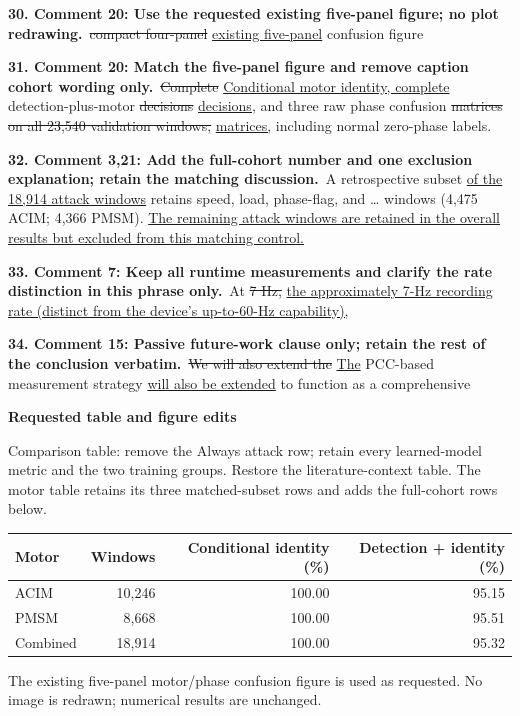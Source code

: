 \documentclass[10pt,letterpaper]{article}
\newcommand{\added}[1]{{\color{blue}\uline{#1}}}
\newcommand{\removed}[1]{{\color{red}\sout{#1}}}
\begin{document}
\textbf{30. Comment 20: Use the requested existing five-panel figure; no plot redrawing.}\
\removed{compact four-panel} \added{existing five-panel} confusion figure\par
\textbf{31. Comment 20: Match the five-panel figure and remove caption cohort wording only.}\
\removed{Complete} \added{Conditional motor identity, complete} detection-plus-motor \removed{decisions} \added{decisions,} and three raw phase confusion \removed{matrices on all 23,540 validation windows,} \added{matrices,} including normal zero-phase labels.\par
\textbf{32. Comment 3,21: Add the full-cohort number and one exclusion explanation; retain the matching discussion.}\
A retrospective subset \added{of the 18,914 attack windows} retains speed, load, phase-flag, and \ldots{} windows (4,475 ACIM; 4,366 PMSM). \added{The remaining attack windows are retained in the overall results but excluded from this matching control.}\par
\textbf{33. Comment 7: Keep all runtime measurements and clarify the rate distinction in this phrase only.}\
At \removed{7 Hz,} \added{the approximately 7-Hz recording rate (distinct from the device's up-to-60-Hz capability),}\par
\textbf{34. Comment 15: Passive future-work clause only; retain the rest of the conclusion verbatim.}\
\removed{We will also extend the} \added{The} PCC-based measurement strategy \added{will also be extended} to function as a comprehensive\par
\textbf{Requested table and figure edits}\par
Comparison table: remove the Always attack row; retain every learned-model metric and the two training groups. Restore the literature-context table. The motor table retains its three matched-subset rows and adds the full-cohort rows below.\par
\begin{center}\begin{tabular}{lrrr}
Motor & Windows & Conditional identity (\%) & Detection + identity (\%)\\\hline
ACIM & 10,246 & 100.00 & 95.15\\
PMSM & 8,668 & 100.00 & 95.51\\
Combined & 18,914 & 100.00 & 95.32\\
\end{tabular}\end{center}
The existing five-panel motor/phase confusion figure is used as requested. No image is redrawn; numerical results are unchanged.\par
\end{document}
